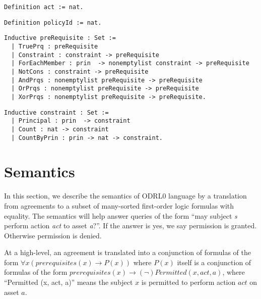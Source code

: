 \lstset{language=Coq}
\begin{lstlisting}[frame=single, caption={act},label={lst:actcoq}]
Definition act := nat.
\end{lstlisting}

\lstset{language=Coq}
\begin{lstlisting}[frame=single, caption={policyId},label={lst:policyIdcoq}]
Definition policyId := nat.
\end{lstlisting}

\lstset{language=Coq}
\begin{lstlisting}[frame=single, caption={preRequisite},label={lst:preRequisitecoq}]
Inductive preRequisite : Set :=
  | TruePrq : preRequisite
  | Constraint : constraint -> preRequisite 
  | ForEachMember : prin  -> nonemptylist constraint -> preRequisite
  | NotCons : constraint -> preRequisite 
  | AndPrqs : nonemptylist preRequisite -> preRequisite
  | OrPrqs : nonemptylist preRequisite -> preRequisite
  | XorPrqs : nonemptylist preRequisite -> preRequisite.
\end{lstlisting}

\lstset{language=Coq}
\begin{lstlisting}[frame=single, caption={constraint},label={lst:constraintcoq}]
Inductive constraint : Set :=
  | Principal : prin  -> constraint 
  | Count : nat -> constraint 
  | CountByPrin : prin -> nat -> constraint.
\end{lstlisting}


\section{Semantics}
\label{sec:Semantics}

In this section, we describe the semantics of ODRL0 language by a translation from agreements to a subset of many-sorted first-order logic formulas with equality. The semantics will help answer queries of the form ``may subject \emph{s} perform action \emph{act} to asset \emph{a}?''. If the answer is yes, we say permission is granted. Otherwise permission is denied. 


At a high-level, an agreement is translated into a conjunction of formulas of the form $\forall x ( prerequisites(x) \rightarrow P(x))$ where $P(x)$ itself is a conjunction of formulas of the form $ prerequisites(x) \rightarrow (\lnot) Permitted (x, act, a)$, where ``Permitted (x, act, a)'' means the subject $x$ is permitted to perform action $act$ on asset $a$.


